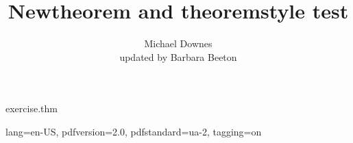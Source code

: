 \begin{filecontents}{exercise.thm}
\def\th@exercise{%
  \normalfont %
  \thm@headpunct{:}%
}
\end{filecontents}
\DocumentMetadata
  {
    lang=en-US,
    pdfversion=2.0,
    pdfstandard=ua-2,
    tagging=on
  }
\documentclass{article}
\title{Newtheorem and theoremstyle test}
\author{Michael Downes\\updated by Barbara Beeton}

\usepackage{unicode-math}
\usepackage[exercise]{amsthm}

\newtheorem{thm}{Theorem}[section]
\newtheorem{cor}[thm]{Corollary}
\newtheorem{prop}{Proposition}
\newtheorem{lem}[thm]{Lemma}

\theoremstyle{remark}
\newtheorem*{rmk}{Remark}

\theoremstyle{plain}
\newtheorem*{Ahlfors}{Ahlfors' Lemma}

  {3pt}%
  {3pt}%
  {}%
  {}%
  {\itshape}%
  {:}%
  {.5em}%
  {}%

\theoremstyle{note}
\newtheorem{note}{Note}

  {3pt}%
  {3pt}%
  {\itshape}%
  {}%
  {\bfseries}%
  {.}%
  {.5em}%
  {\thmnote{#3}}%

\theoremstyle{citing}
\newtheorem*{varthm}{}%

  {9pt}%
  {9pt}%
  {\itshape}%
  {}%
  {\bfseries}%
  {.}%
  {\newline}%
  {}%

